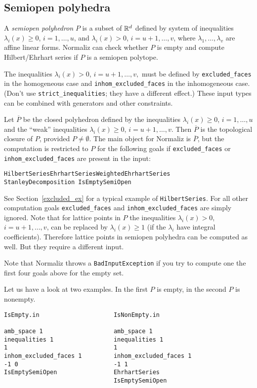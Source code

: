\subsection{Semiopen polyhedra}\label{semi_open}

A \emph{semiopen polyhedron} $P$ is a subset of ${\mathbb R}^d$ defined by system of inequalities $\lambda_i(x)\ge 0$, $i=1,\dots,u$, and $\lambda_i(x)> 0$, $i=u+1,\dots,v$, where $\lambda_1,\dots,\lambda_v$ are affine linear forms. Normaliz can check whether $P$ is empty and compute Hilbert/Ehrhart series if $P$ is a semiopen polytope.

The inequalities $\lambda_i(x)> 0$, $i=u+1,\dots,v,$ must be defined by \verb|excluded_faces| in the homogeneous case and \verb|inhom_excluded_faces| in the inhomogeneous case. (Don't use \verb|strict_inequalities|; they have a different effect.) These input types can be combined with generators and other constraints.

Let $\overline P$ be the closed polyhedron defined by the inequalities $\lambda_i(x)\ge 0$, $i=1,\dots,u$ and the ``weak'' inequalities $\lambda_i(x)\ge 0$, $i=u+1,\dots,v$. Then $\overline P$ is the topological closure of $P$, provided $P\neq\emptyset$. The main object for Normaliz is $\overline P$, but the computation is restricted to $P$ for the following goals if \verb|excluded_faces| or \verb|inhom_excluded_faces| are present in the input:
\begin{center}
	\texttt{HilbertSeries\quad EhrhartSeries\quad WeightedEhrhartSeries\\ StanleyDecomposition \quad IsEmptySemiOpen}
\end{center}
See Section~\ref{excluded_ex} for a typical example of \verb|HilbertSeries|. For all other computation goals \verb|excluded_faces| and \verb|inhom_excluded_faces| are simply ignored. Note that for lattice points in $P$ the inequalities $\lambda_i(x)> 0$, $i=u+1,\dots,v$, can be replaced by $\lambda_i(x)\ge 1$ (if the $\lambda_i$ have integral coefficients). Therefore lattice points in semiopen polyhedra can be computed as well. But they require a different input.

Note that Normaliz throws a \verb|BadInputException| if you try to compute one the first four goals above for the empty set.

Let us have a look at two examples. In the first $P$ is empty, in the second $P$ is nonempty.
\begin{Verbatim}
IsEmpty.in                     IsNonEmpty.in

amb_space 1                    amb_space 1
inequalities 1                 inequalities 1
1                              1
inhom_excluded_faces 1         inhom_excluded_faces 1
-1 0                           -1 1
IsEmptySemiOpen                EhrhartSeries
                               IsEmptySemiOpen
\end{Verbatim}

